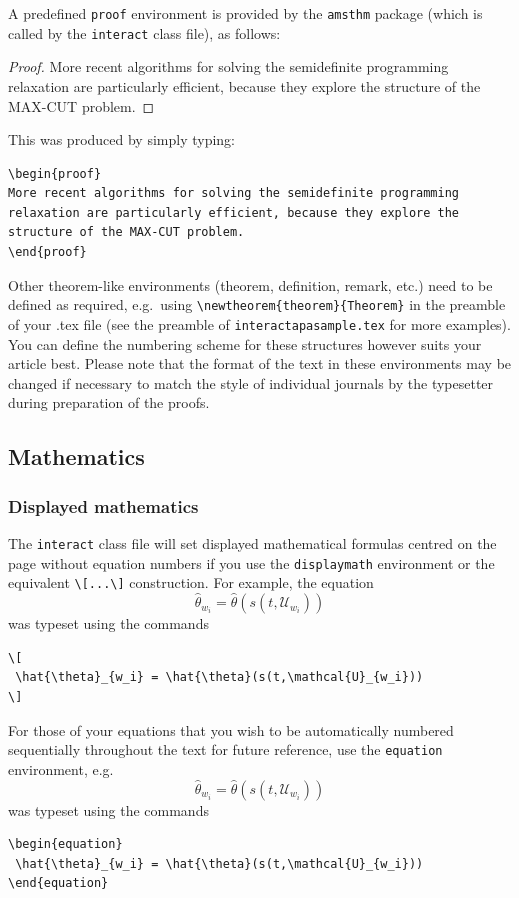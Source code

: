 \documentclass[]{interact}
\theoremstyle{plain}%
\theoremstyle{definition}
\theoremstyle{remark}
\begin{document}
A predefined \verb"proof" environment is provided by the \texttt{amsthm} package (which is called by the \texttt{interact} class file), as follows:
\begin{proof}
More recent algorithms for solving the semidefinite programming relaxation are particularly efficient, because they explore the structure of the MAX-CUT problem.
\end{proof}
\noindent This was produced by simply typing:
\begin{verbatim}
\begin{proof}
More recent algorithms for solving the semidefinite programming
relaxation are particularly efficient, because they explore the
structure of the MAX-CUT problem.
\end{proof}
\end{verbatim}
Other theorem-like environments (theorem, definition, remark, etc.) need to be defined as required, e.g.\ using \verb"\newtheorem{theorem}{Theorem}" in the preamble of your .tex file (see the preamble of \verb"interactapasample.tex" for more examples). You can define the numbering scheme for these structures however suits your article best. Please note that the format of the text in these environments may be changed if necessary to match the style of individual journals by the typesetter during preparation of the proofs.


\subsection{Mathematics}

\subsubsection{Displayed mathematics}

The \texttt{interact} class file will set displayed mathematical formulas centred on the page without equation numbers if you use the \texttt{displaymath} environment or the equivalent \verb"\[...\]" construction. For example, the equation
\[
 \hat{\theta}_{w_i} = \hat{\theta}(s(t,\mathcal{U}_{w_i}))
\]
was typeset using the commands
\begin{verbatim}
\[
 \hat{\theta}_{w_i} = \hat{\theta}(s(t,\mathcal{U}_{w_i}))
\]
\end{verbatim}

For those of your equations that you wish to be automatically numbered sequentially throughout the text for future reference, use the \texttt{equation} environment, e.g.
\begin{equation}
 \hat{\theta}_{w_i} = \hat{\theta}(s(t,\mathcal{U}_{w_i}))
\end{equation}
was typeset using the commands
\begin{verbatim}
\begin{equation}
 \hat{\theta}_{w_i} = \hat{\theta}(s(t,\mathcal{U}_{w_i}))
\end{equation}
\end{verbatim}
\end{document}
